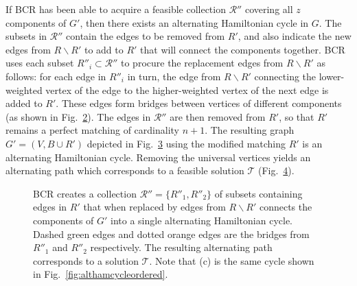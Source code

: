\documentclass[a4paper,11pt,authoryear]{elsarticle}
\newcommand{\rev}[1]{{\color{myRed}#1}}
\begin{document}
\rev{If BCR has been able to acquire a feasible collection $\mathcal{R}''$ covering all $z$ components of $G'$, then there exists an alternating Hamiltonian cycle in $G$. The subsets in $\mathcal{R}''$ contain the edges to be removed from $R'$, and also indicate the new edges from $R\backslash R'$ to add to $R'$ that will connect the components together.} BCR uses each subset $R''_i \subset \mathcal{R}''$ to procure the replacement edges from $R\backslash R'$ as follows: for each edge in $R''_i$ in turn, the edge from $R \backslash R'$ connecting the lower-weighted vertex of the edge to the higher-weighted vertex of the next edge is added to $R'$. These edges form bridges between vertices of different components (as shown in Fig.~\ref{fig:mpsconnect}). The edges in $\mathcal{R}''$ are then removed from $R'$, so that $R'$ remains a perfect matching of cardinality $n+1$. The resulting graph $G'=(V, B \cup R')$ depicted in Fig.~\ref{fig:mpscycle} using the modified matching $R'$ is an alternating Hamiltonian cycle. Removing the universal vertices yields an alternating path which corresponds to a feasible solution $\mathcal{T}$ (Fig.~\ref{fig:solutionpath}).

\begin{figure}[h]	
	\centering
	\begin{subfigure}[h]{0.35\textwidth}
		
		\caption{}
		\label{fig:bcrlist}
	\end{subfigure} \hspace{7mm} %
	\begin{subfigure}[h]{0.25\textwidth}
		
		\caption{}
		\label{fig:mpsconnect}
	\end{subfigure} \hspace{7mm} %
	\begin{subfigure}[h]{0.25\textwidth}
		
		\caption{}
		\label{fig:mpscycle}
	\end{subfigure}
	\begin{subfigure}[h]{0.75\textwidth}
		
		\caption{}
		\label{fig:solutionpath}
	\end{subfigure}
	\caption{BCR creates a collection $\mathcal{R}'' = \{R''_1, R''_2\}$ of subsets containing edges in $R'$ that when replaced by edges from $R\backslash R'$ connects the components of $G'$ into a single alternating Hamiltonian cycle. Dashed green edges and dotted orange edges are the bridges from $R''_1$ and $R''_2$ respectively. The resulting alternating path corresponds to a solution $\mathcal{T}$. Note that (c) is the same cycle shown in Fig.~\ref{fig:althamcycleordered}.}
	\label{fig:bcr}
\end{figure}
\end{document}
